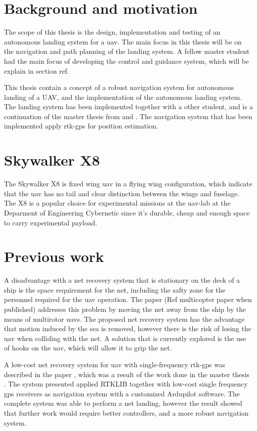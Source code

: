\section{Background and motivation}
 


The scope of this thesis is the design, implementation and testing of an autonomous landing system for a uav. The main focus in this thesis will be on the navigation and path planning of the landing system. A fellow master student had the main focus of developing the control and guidance system, which will be explain in section ref.


This thesis contain a concept of a robust navigation system for autonomous landing of a UAV, and the implementation of the autonomous landing system. The landing system has been implemented together with a other student, and is a continuation of the master thesis from \citep{Froelich} and \citep{Skulstad&Syversen}. The navigation system that has been implemented apply rtk-gps for position estimation.
\section{Skywalker X8}
The Skywalker X8 is fixed wing \gls{uav} in a flying wing configuration, which indicate that the \gls{uav} has no tail and clear distinction between the wings and fuselage. The X8 is a popular choice for experimental missions at the \gls{uav}-lab at the Deparment of Engineering Cybernetic since it's durable, cheap and enough space to carry experimental payload.
\section{Previous work}
A disadvantage with a net recovery system that is stationary on the deck of a ship is the space requirement for the net, including the safty zone for the personnel required for the uav operation. The paper (Ref multicopter paper when published) addresses this problem by moving the net away from the ship by the means of multirotor uavs. The proposed net recovery system has the advantage that motion induced by the sea is removed, however there is the risk of losing the uav when colliding with the net. A solution that is currently explored is the use of hooks on the uav, which will allow it to grip the net.

A low-cost net recovery system for \gls{uav} with single-frequency \gls{rtk-gps} was described in the paper \citep{skulstad2015net}, which was a result of the work done in the master thesis \citep{Skulstad&Syversen}. The system presented applied RTKLIB together with low-cost single frequency \gls{gps} receivers as navigation system with a customized Ardupilot software. The complete system was able to perform a net landing, however the result showed that further work would require better controllers, and a more robust navigation system.


